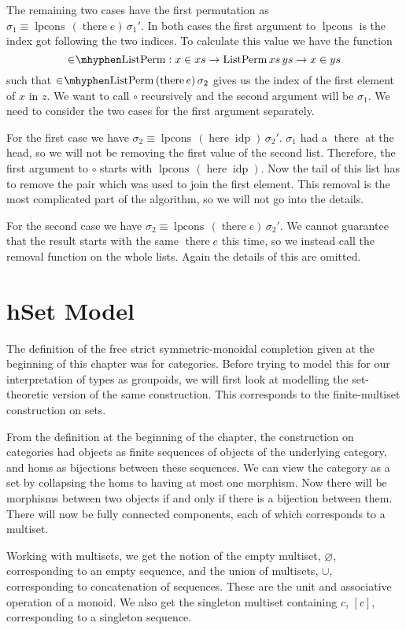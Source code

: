 \documentclass[12pt, parskip, DIV=14]{scrbook}
\renewcommand{\circ}{\vysmwhtcircle}
\newcommand{\idp}{\operatorname{idp}}
\newcommand{\here}{\operatorname{here}}
\newcommand{\there}{\operatorname{there}}
\newcommand{\ListPerm}{\operatorname{ListPerm}}
\newcommand{\lpcons}{\operatorname{lpcons}}
\begin{document}
The remaining two cases have the first permutation as $\sigma_1 \equiv \lpcons\,(\there e)\,\sigma_1'$. In both cases the first argument to $\lpcons$ is the index got following the two indices. To calculate this value we have the function
$$\mathrm{\in\mkern-4mu\mhyphen ListPerm} : x \in xs \to \ListPerm xs\,ys \to x \in ys$$
such that $\mathrm{\in\mkern-4mu\mhyphen ListPerm}\,(\there e)\,\sigma_2$ gives us the index of the first element of $x$ in $z$. We want to call $\circ$ recursively and the second argument will be $\sigma_1$. We need to consider the two cases for the first argument separately.

For the first case we have $\sigma_2 \equiv \lpcons\,(\here \idp)\,\sigma_2'$. $\sigma_1$ had a $\there$ at the head, so we will not be removing the first value of the second list. Therefore, the first argument to $\circ$ starts with $\lpcons\,(\here \idp)$. Now the tail of this list has to remove the pair which was used to join the first element. This removal is the most complicated part of the algorithm, so we will not go into the details.

For the second case we have $\sigma_2 \equiv \lpcons\,(\there e)\,\sigma_2'$. We cannot guarantee that the result starts with the same $\there e$ this time, so we instead call the removal function on the whole lists. Again the details of this are omitted.

\section{hSet Model}
\label{sec:hsetmodel}

The definition of the free strict symmetric-monoidal completion given at the beginning of this chapter was for categories. Before trying to model this for our interpretation of types as groupoids, we will first look at modelling the set-theoretic version of the same construction. This corresponds to the finite-multiset construction on sets.

From the definition at the beginning of the chapter, the construction on categories had objects as finite sequences of objects of the underlying category, and homs as bijections between these sequences. We can view the category as a set by collapsing the homs to having at most one morphism. Now there will be morphisms between two objects if and only if there is a bijection between them. There will now be fully connected components, each of which corresponds to a multiset.

Working with multisets, we get the notion of the empty multiset, $\varnothing$, corresponding to an empty sequence, and the union of multisets, $\cup$, corresponding to concatenation of sequences. These are the unit and associative operation of a monoid. We also get the singleton multiset containing $c$, $[c]$, corresponding to a singleton sequence.
\end{document}
